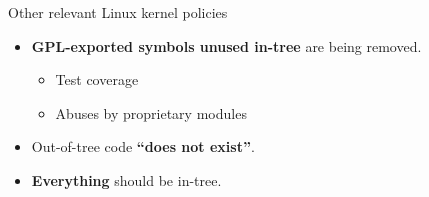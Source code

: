 
\appendix
{}

\begin{frame}{Other relevant Linux kernel policies}
  \large
  \vspace{2mm}
  \begin{itemize}\setlength{\itemsep}{5mm}
  \item \textbf{GPL-exported symbols unused in-tree} are being removed.
        \begin{itemize}\normalsize
        \item Test coverage
        \item Abuses by proprietary modules
        \end{itemize}
  \item Out-of-tree code \textbf{``does not exist''}.
  \item \textbf{Everything} should be in-tree.
  \end{itemize}
\end{frame}
